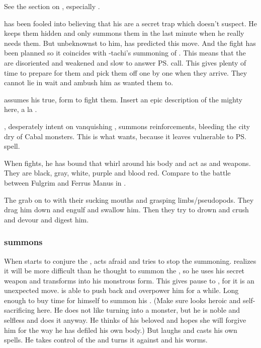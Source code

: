 See the section on , especially .

\Teshrial{} has been fooled into believing that his \noggyaleth{} are a secret trap which \Ishnaruchaefir{} doesn't suspect. 
He keeps them hidden and only summons them in the last minute when he really needs them. 
But unbeknownst to him, \Ishnaruchaefir{} has predicted this move. 
And the fight has been planned so it coincides with \Psyrex-tachi's summoning of \Nithdornazsh. 
This means that the \noggyaleth{} are disoriented and weakened and slow to answer \ps{\Teshrial} call. 
This gives \Ishnaruchaefir{} plenty of time to prepare for them and pick them off one by one when they arrive. 
They cannot lie in wait and ambush him as \Teshrial{} wanted them to. 

\Ishnaruchaefir{} assumes his true, \draconian{} form to fight them. 
Insert an epic description of the mighty \dragon{} here, a la . 

\Teshrial{}, desperately intent on vanquishing \Ishnaruchaefir{}, summons reinforcements, bleeding the city dry of Cabal monsters. 
This is what \Ishnaruchaefir{} wants, because it leaves \Malcur vulnerable to \ps{\Psyrex}{} spell. 

When \Ishnaruchaefir{} fights, he has bound \daemons{} that whirl around his body and act as \armour and weapons. 
They are black, gray, white, purple and blood red. 
Compare to the battle between Fulgrim and Ferrus Manus in . 

The \noggyaleth grab on to \Ishnaruchaefir with their sucking mouths and grasping limbs/pseudopods.
They drag him down and engulf and swallow him.
Then they try to drown and crush and devour and digest him.




\subsubsection{\Teshrial summons \malgryph}
When \Teshrial starts to conjure the \malgryph, \Ishnaruchaefir acts afraid and tries to stop the summoning.
\Teshrial realizes it will be more difficult than he thought to summon the \malgryph, so he uses his secret weapon and transforms into his monstrous form.
This gives pause to \Ishnaruchaefir, for it is an unexpected move. 
\Teshrial is able to push back \Ishnaruchaefir and overpower him for a while. 
Long enough to buy time for himself to summon his \malgryph.
(Make sure \Teshrial looks heroic and self-sacrificing here. He does not like turning into a monster, but he is noble and selfless and does it anyway. He thinks of his beloved and hopes she will forgive him for the way he has defiled his own body.)
But \Ishnaruchaefir laughs and casts his own spells.
He takes control of the \malgryph and turns it against \Teshrial and his worms.





